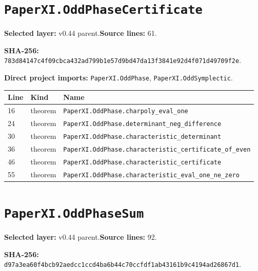 \documentclass[10pt,oneside]{book}
\begin{document}
\section{\texorpdfstring{\nolinkurl{PaperXI.OddPhaseCertificate}}{PaperXI.OddPhaseCertificate}}\label{module:PaperXI.OddPhaseCertificate}

\textbf{Selected layer:} v0.44 parent.\quad\textbf{Source lines:} 61.\par\textbf{SHA-256:} {\scriptsize\nolinkurl{783d84147c4f09cbca432ad799b1e57d9bd47da13f3841e92d4f071d49709f2e}}.


\textbf{Direct project imports:} \nolinkurl{PaperXI.OddPhase}, \nolinkurl{PaperXI.OddSymplectic}.

\begin{longtable}{@{}p{}p{}p{}@{}}\toprule Line&Kind&Name\\\midrule\endhead

16&theorem&\nolinkurl{PaperXI.OddPhase.charpoly_eval_one}\\

24&theorem&\nolinkurl{PaperXI.OddPhase.determinant_neg_difference}\\

30&theorem&\nolinkurl{PaperXI.OddPhase.characteristic_determinant}\\

36&theorem&\nolinkurl{PaperXI.OddPhase.characteristic_certificate_of_even}\\

46&theorem&\nolinkurl{PaperXI.OddPhase.characteristic_certificate}\\

55&theorem&\nolinkurl{PaperXI.OddPhase.characteristic_eval_one_ne_zero}\\

\bottomrule\end{longtable}

\section{\texorpdfstring{\nolinkurl{PaperXI.OddPhaseSum}}{PaperXI.OddPhaseSum}}\label{module:PaperXI.OddPhaseSum}

\textbf{Selected layer:} v0.44 parent.\quad\textbf{Source lines:} 92.\par\textbf{SHA-256:} {\scriptsize\nolinkurl{d97a3ea60f4bcb92aedcc1ccd4ba6b44c70ccfdf1ab43161b9c4194ad26867d1}}.
\end{document}
